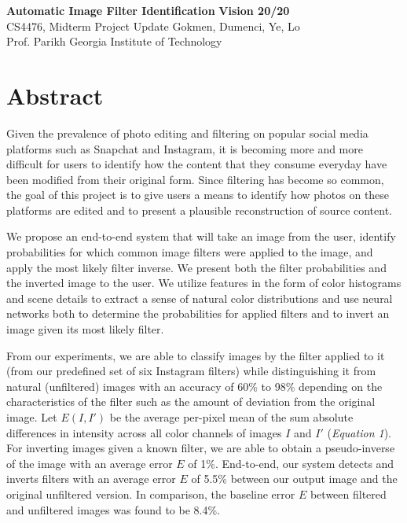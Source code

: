 \documentclass[11pt]{article}
\begin{document}
\noindent
\large\textbf{Automatic Image Filter Identification} \hfill \textbf{Vision 20/20} \\
\normalsize CS4476, Midterm Project Update \hfill Gokmen, Dumenci, Ye, Lo \\
Prof. Parikh \hfill Georgia Institute of Technology

\section*{Abstract}
Given the prevalence of photo editing and filtering on popular social media platforms such as Snapchat and Instagram, it is becoming more and more difficult for users to identify how the content that they consume everyday have been modified from their original form. Since filtering has become so common, the goal of this project is to give users a means to identify how photos on these platforms are edited and to present a plausible reconstruction of source content.

We propose an end-to-end system that will take an image from the user, identify probabilities for which common image filters were applied to the image, and apply the most likely filter inverse. We present both the filter probabilities and the inverted image to the user. We utilize features in the form of color histograms and scene details to extract a sense of natural color distributions and use neural networks both to determine the probabilities for applied filters and to invert an image given its most likely filter.



From our experiments, we are able to classify images by the filter applied to it (from our predefined set of six Instagram filters) while distinguishing it from natural (unfiltered) images with an accuracy of 60\% to 98\% depending on the characteristics of the filter such as the amount of deviation from the original image. Let $E(I, I')$ be the average per-pixel mean of the sum absolute differences in intensity across all color channels of images $I$ and $I'$ (\textit{Equation 1}). For inverting images given a known filter, we are able to obtain a pseudo-inverse of the image with an average error $E$ of 1\%. End-to-end, our system detects and inverts filters with an average error $E$ of 5.5\% between our output image and the original unfiltered version. In comparison, the baseline error $E$ between filtered and unfiltered images was found to be 8.4\%.
\end{document}
